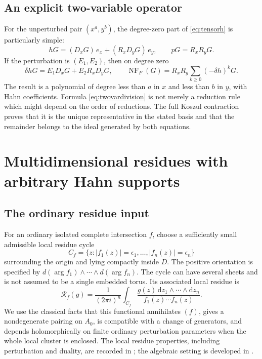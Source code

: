 \documentclass[11pt,letterpaper]{article}
\theoremstyle{definition}
\theoremstyle{remark}
\newcommand{\NF}{\operatorname{NF}}
\newcommand{\RR}{\mathcal R}
\newcommand{\dd}{\mathrm d}
\begin{document}
\subsection{An explicit two-variable operator}
For the unperturbed pair $(x^a,y^b)$, the degree-zero part of \eqref{eq:tensorh} is particularly simple:
\[
 hG=(D_xG)\,e_x+(R_xD_yG)\,e_y,
 \qquad pG=R_xR_yG.
\]
If the perturbation is $(E_1,E_2)$, then on degree zero
\begin{equation}\label{eq:twovardivision}
 \delta hG=E_1D_xG+E_2R_xD_yG,
 \qquad
 \NF_F(G)=R_xR_y\sum_{k\geq0}(-\delta h)^kG.
\end{equation}
The result is a polynomial of degree less than $a$ in $x$ and less than $b$ in $y$, with Hahn coefficients. Formula \eqref{eq:twovardivision} is not merely a reduction rule which might depend on the order of reductions. The full Koszul contraction proves that it is the unique representative in the stated basis and that the remainder belongs to the ideal generated by both equations.

\section{Multidimensional residues with arbitrary Hahn supports}
\label{sec:residues}

\subsection{The ordinary residue input}
For an ordinary isolated complete intersection $f$, choose a sufficiently small admissible local residue cycle
\[
 C_f=\{z:|f_1(z)|=\epsilon_1,\ldots,|f_n(z)|=\epsilon_n\}
\]
surrounding the origin and lying compactly inside $D$. The positive orientation is specified by
$d(\arg f_1)\wedge\cdots\wedge d(\arg f_n)$. The cycle can have several sheets and is not assumed to be a single embedded torus. Its associated local residue is
\[
 \RR_f(g)=\frac{1}{(2\pi i)^n}\int_{C_f}
       \frac{g(z)\,\dd z_1\wedge\cdots\wedge\dd z_n}{f_1(z)\cdots f_n(z)}.
\]
We use the classical facts that this functional annihilates $(f)$, gives a nondegenerate pairing on $A_0$, is compatible with a change of generators, and depends holomorphically on finite ordinary perturbation parameters when the whole local cluster is enclosed. The local residue properties, including perturbation and duality, are recorded in \cite[\S I(a)]{GriffithsHarris}; the algebraic setting is developed in \cite{Hartshorne,Kunz}.
\end{document}
